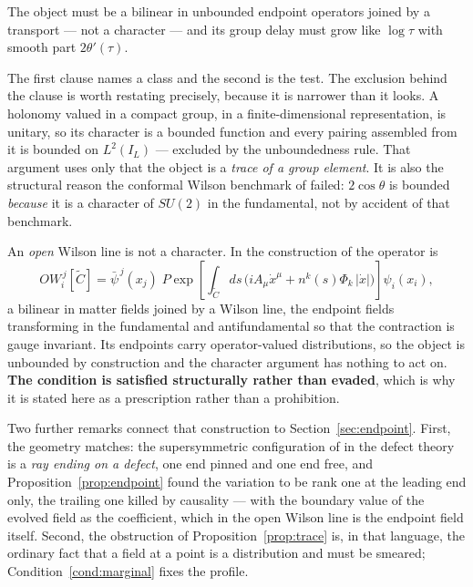 \begin{condition}\label{cond:bilinear}
The object must be a bilinear in unbounded endpoint operators joined by a
transport --- not a character --- and its group delay must grow like $\log\tau$
with smooth part $2\theta'(\tau)$.
\end{condition}

The first clause names a class and the second is the test. The exclusion behind
the clause is worth restating precisely, because it is narrower than it looks. A
holonomy valued in a compact group, in a finite-dimensional representation, is
unitary, so its character is a bounded function and every pairing assembled from
it is bounded on $L^2(I_L)$ --- excluded by the unboundedness rule. That argument
uses only that the object is a \emph{trace of a group element}. It is also the
structural reason the conformal Wilson benchmark of \cite{Selection} failed:
$2\cos\theta$ is bounded \emph{because} it is a character of $SU(2)$ in the
fundamental, not by accident of that benchmark.

An \emph{open} Wilson line is not a character. In the construction of
\cite{OWL} the operator is
\[
 OW_i^{\,j}[\tilde C]=\bar\psi^{\,j}(x_j)\;
 P\exp\!\left[\int_{\tilde C}\!ds\,\Big(iA_\mu\dot x^\mu
 +n^k(s)\Phi_k\,|\dot x|\Big)\right]\psi_i(x_i),
\]
a bilinear in matter fields joined by a Wilson line, the endpoint fields
transforming in the fundamental and antifundamental so that the contraction is
gauge invariant. Its endpoints carry operator-valued distributions, so the object
is unbounded by construction and the character argument has nothing to act on.
\textbf{The condition is satisfied structurally rather than evaded}, which is why
it is stated here as a prescription rather than a prohibition.

Two further remarks connect that construction to Section~\ref{sec:endpoint}.
First, the geometry matches: the supersymmetric configuration of \cite{OWL} in
the defect theory is a \emph{ray ending on a defect}, one end pinned and one end
free, and Proposition~\ref{prop:endpoint} found the variation to be rank one at
the leading end only, the trailing one killed by causality --- with the boundary
value of the evolved field as the coefficient, which in the open Wilson line is
the endpoint field itself. Second, the obstruction of Proposition~\ref{prop:trace}
is, in that language, the ordinary fact that a field at a point is a distribution
and must be smeared; Condition~\ref{cond:marginal} fixes the profile.


